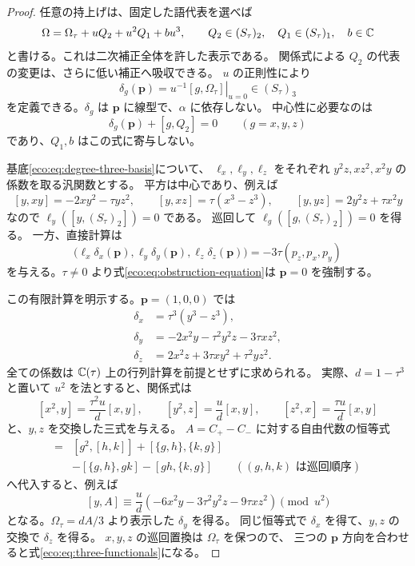 \begin{proof}
任意の持上げは、固定した語代表を選べば
\[
 \Omega=\Omega_\tau+uQ_2+u^2Q_1+bu^3,
 \qquad Q_2\in(S_\tau)_2,\quad Q_1\in(S_\tau)_1,\quad b\in\mathbb C
\]
と書ける。これは二次補正全体を許した表示である。
関係式による $Q_2$ の代表の変更は、さらに低い補正へ吸収できる。
$u$ の正則性により
\[
 \delta_g(\mathbf p)
    =\left.u^{-1}[g,\Omega_\tau]\right|_{u=0}\in(S_\tau)_3
\]
を定義できる。$\delta_g$ は $\mathbf p$ に線型で、$\alpha$ に依存しない。
中心性に必要なのは
\begin{equation}\label{eco:eq:obstruction-equation}
             \delta_g(\mathbf p)+[g,Q_2]=0
             \qquad(g=x,y,z)
\end{equation}
であり、$Q_1,b$ はこの式に寄与しない。

基底\eqref{eco:eq:degree-three-basis}について、
$\ell_x,\ell_y,\ell_z$ をそれぞれ
$y^2z,xz^2,x^2y$ の係数を取る汎関数とする。
平方は中心であり、例えば
\[
 [y,xy]=-2xy^2-\tau yz^2,\qquad
 [y,xz]=\tau(x^3-z^3),\qquad
 [y,yz]=2y^2z+\tau x^2y
\]
なので $\ell_y([y,(S_\tau)_2])=0$ である。
巡回して $\ell_g([g,(S_\tau)_2])=0$ を得る。
一方、直接計算は
\begin{equation}\label{eco:eq:three-functionals}
 \bigl(\ell_x\delta_x(\mathbf p),\ell_y\delta_y(\mathbf p),
       \ell_z\delta_z(\mathbf p)\bigr)
      =-3\tau(p_z,p_x,p_y)
\end{equation}
を与える。$\tau\ne0$ より式\eqref{eco:eq:obstruction-equation}は
$\mathbf p=0$ を強制する。

この有限計算を明示する。$\mathbf p=(1,0,0)$ では
\begin{equation}\label{eco:eq:first-order-table}
 \begin{split}
 \delta_x&=\tau^3(y^3-z^3),\\
 \delta_y&=-2x^2y-\tau^2y^2z-3\tau xz^2,\\
 \delta_z&=2x^2z+3\tau xy^2+\tau^2yz^2.
 \end{split}
\end{equation}
全ての係数は $\mathbb C(\tau)$ 上の行列計算を前提とせずに求められる。
実際、$d=1-\tau^3$ と置いて $u^2$ を法とすると、関係式は
\[
 [x^2,y]=\frac{\tau^2u}{d}[x,y],\qquad
 [y^2,z]=\frac{u}{d}[x,y],\qquad
 [z^2,x]=\frac{\tau u}{d}[x,y]
\]
と、$y,z$ を交換した三式を与える。
$A=C_+-C_-$ に対する自由代数の恒等式
\begin{align*}
 [g,A]={}&[g^2,[h,k]]+[\{g,h\},\{k,g\}]\\
         &-[\{g,h\},gk]-[gh,\{k,g\}]
 \qquad ((g,h,k)\text{ は巡回順序})
\end{align*}
へ代入すると、例えば
\[
 [y,A]\equiv\frac{u}{d}
      (-6x^2y-3\tau^2y^2z-9\tau xz^2)\pmod {u^2}
\]
となる。$\Omega_\tau=dA/3$ より表示した $\delta_y$ を得る。
同じ恒等式で $\delta_x$ を得て、$y,z$ の交換で $\delta_z$ を得る。
$x,y,z$ の巡回置換は $\Omega_\tau$ を保つので、
三つの $\mathbf p$ 方向を合わせると式\eqref{eco:eq:three-functionals}になる。


\end{proof}
